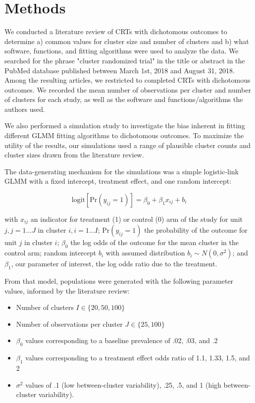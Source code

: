 \documentclass[Afour,times,sagev,doublespace]{sagej}
\begin{document}
\section{Methods}


We conducted a literature review of CRTs with dichotomous outcomes to determine a) common values for cluster size and number of clusters and b) what software, functions, and fitting algorithms were used to analyze the data. We searched for the phrase "cluster randomized trial" in the title or abstract in the PubMed database published between March 1st, 2018 and August 31, 2018. Among the resulting articles, we restricted to completed CRTs with dichotomous outcomes. We recorded the mean number of observations per cluster and number of clusters for each study, as well as the software and functions/algorithms the authors used.

We also performed a simulation study to investigate the bias inherent in fitting different GLMM fitting algorithms to dichotomous outcomes. To maximize the utility of the results, our simulations used a range of plausible cluster counts and cluster sizes drawn from the literature review.

The data-generating mechanism for the simulations was a simple logistic-link GLMM with a fixed intercept, treatment effect, and one random intercept:

\begin{equation}
    \text{logit}[\text{Pr}(y_{ij}=1)]=\beta_0 + \beta_1 x_{ij} + b_i
\end{equation}

with $x_{ij}$ an indicator for treatment (1) or control (0) arm of the study for unit $j, j = 1 \dots J$  in cluster $i, i = 1 \dots I$; $\text{Pr}(y_{ij}=1)$ the probability of the outcome for unit $j$ in cluster $i$; $\beta_0$ the log odds of the outcome for the mean cluster in the control arm; random intercept $b_i$ with assumed distribution $b_i \sim N(0, \sigma^2)$; and $\beta_1$, our parameter of interest, the log odds ratio due to the treatment. 

From that model, populations were generated with the following parameter values, informed by the literature review:
\begin{itemize}
    \item Number of clusters $I \in \{20, 50, 100\}$
    \item Number of observations per cluster $J \in \{25, 100\}$
    \item $\beta_0$ values corresponding to a baseline prevalence of .02, .03, and .2
    \item $\beta_1$ values corresponding to a treatment effect odds ratio of 1.1, 1.33, 1.5, and 2
    \item $\sigma^2$ values of .1 (low between-cluster variability), .25, .5, and 1 (high between-cluster variability).
\end{itemize}
\end{document}
